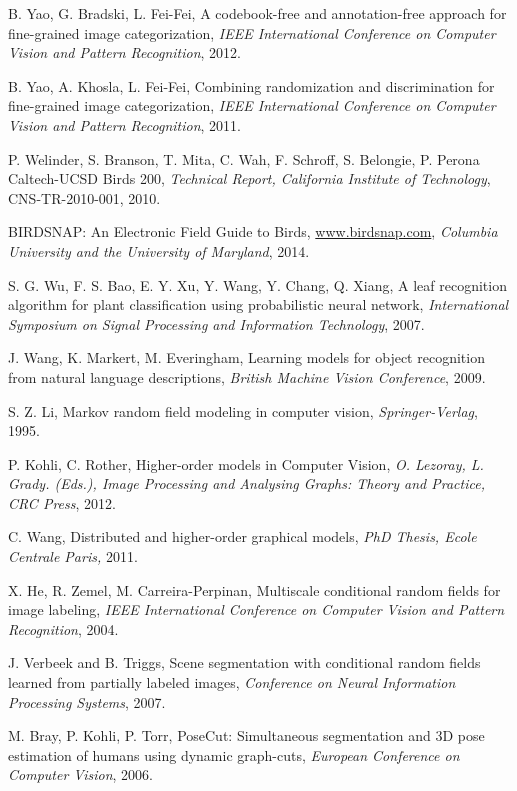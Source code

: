 \documentclass{article}
\begin{document}
\begin{thebibliography}{100}
B. Yao, G. Bradski, L. Fei-Fei, 
A codebook-free and annotation-free approach for fine-grained image categorization, 
\emph{IEEE International Conference on Computer Vision and Pattern Recognition},
2012. 

B. Yao, A. Khosla, L. Fei-Fei, 
Combining randomization and discrimination for fine-grained image categorization,
\emph{IEEE International Conference on Computer Vision and Pattern Recognition}, 2011. 

P. Welinder, S. Branson, T. Mita, C. Wah, F. Schroff, S. Belongie, P. Perona 
Caltech-UCSD Birds 200, 
\emph{Technical Report, California Institute of Technology},
CNS-TR-2010-001, 2010. 

BIRDSNAP: An Electronic Field Guide to Birds, \url{www.birdsnap.com}, 
\emph{Columbia University and the University of Maryland},
2014. 

S. G. Wu, F. S. Bao, E. Y. Xu, Y. Wang, Y. Chang, Q. Xiang,
A leaf recognition algorithm for plant classification using probabilistic neural network,
\emph{International Symposium on Signal Processing and Information Technology}, 2007. 

J. Wang, K. Markert, M. Everingham, 
Learning models for object recognition from natural language descriptions, 
\emph{British Machine Vision Conference}, 2009. 

S. Z. Li, Markov random field modeling in computer vision, 
\emph{Springer-Verlag}, 1995. 

P. Kohli, C. Rother, 
Higher-order models in Computer Vision, 
\emph{O. Lezoray, L. Grady. (Eds.),
Image Processing and Analysing Graphs: Theory and Practice, CRC Press},
2012. 

C. Wang, 
Distributed and higher-order graphical models, 
\emph{PhD Thesis, Ecole Centrale Paris,} 2011.

X. He, R. Zemel, M. Carreira-Perpinan, 
Multiscale conditional random fields for image labeling, 
\emph{IEEE International Conference on Computer Vision and Pattern Recognition},
2004. 

J. Verbeek and B. Triggs, 
Scene segmentation with conditional random fields learned from partially labeled images, 
\emph{Conference on Neural Information Processing Systems}, 2007. 

M. Bray, P. Kohli, P. Torr, 
PoseCut: Simultaneous segmentation and 3D pose estimation of humans using dynamic graph-cuts,
\emph{European Conference on Computer Vision}, 2006. 


\end{thebibliography}
\end{document}
